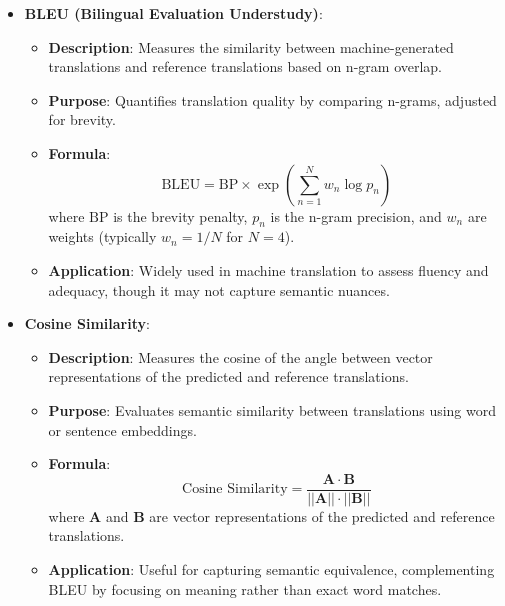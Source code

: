 \begin{itemize}
    \item \textbf{BLEU (Bilingual Evaluation Understudy)}:
    \begin{itemize}
        \item \textbf{Description}: Measures the similarity between machine-generated translations and reference translations based on n-gram overlap.
        \item \textbf{Purpose}: Quantifies translation quality by comparing n-grams, adjusted for brevity.
        \item \textbf{Formula}:
        \[
        \text{BLEU} = \text{BP} \times \exp\left( \sum_{n=1}^{N} w_n \log p_n \right)
        \]
        where $\text{BP}$ is the brevity penalty, $p_n$ is the n-gram precision, and $w_n$ are weights (typically $w_n = 1/N$ for $N=4$).
        \item \textbf{Application}: Widely used in machine translation to assess fluency and adequacy, though it may not capture semantic nuances.
    \end{itemize}
    \item \textbf{Cosine Similarity}:
    \begin{itemize}
        \item \textbf{Description}: Measures the cosine of the angle between vector representations of the predicted and reference translations.
        \item \textbf{Purpose}: Evaluates semantic similarity between translations using word or sentence embeddings.
        \item \textbf{Formula}:
        \[
        \text{Cosine Similarity} = \frac{\mathbf{A} \cdot \mathbf{B}}{||\mathbf{A}|| \cdot ||\mathbf{B}||}
        \]
        where $\mathbf{A}$ and $\mathbf{B}$ are vector representations of the predicted and reference translations.
        \item \textbf{Application}: Useful for capturing semantic equivalence, complementing BLEU by focusing on meaning rather than exact word matches.
    \end{itemize}
\end{itemize}
